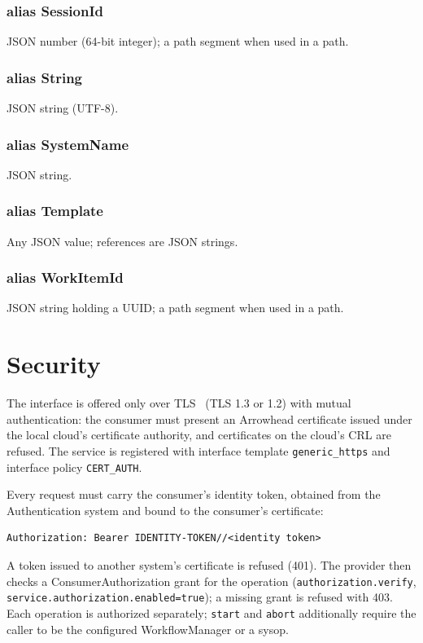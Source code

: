 \documentclass[a4paper]{arrowhead}
\newcommand{\pdef}[1]{{\textcolor{ArrowheadGrey}{#1\label{sec:model:primitives:#1}\label{sec:model:primitives:#1s}}}}
\begin{document}
\subsubsection*{alias \pdef{SessionId}}
JSON number (64-bit integer); a path segment when used in a path.

\subsubsection*{alias \pdef{String}}
JSON string (UTF-8).

\subsubsection*{alias \pdef{SystemName}}
JSON string.

\subsubsection*{alias \pdef{Template}}
Any JSON value; references are JSON strings.

\subsubsection*{alias \pdef{WorkItemId}}
JSON string holding a UUID; a path segment when used in a path.



\section{Security}
\label{sec:security}
The interface is offered only over TLS~\cite{rfc8446} (TLS 1.3 or 1.2) with mutual authentication: the consumer must
present an Arrowhead certificate issued under the local cloud's certificate authority, and certificates on the
cloud's CRL are refused. The service is registered with interface template \texttt{generic\_https} and interface
policy \texttt{CERT\_AUTH}.

Every request must carry the consumer's identity token, obtained from the Authentication system and bound to the
consumer's certificate:
\begin{lstlisting}
Authorization: Bearer IDENTITY-TOKEN//<identity token>
\end{lstlisting}
A token issued to another system's certificate is refused (401). The provider then checks a ConsumerAuthorization
grant for the operation (\texttt{authorization.verify}, \texttt{service.authorization.enabled=true}); a missing grant is
refused with 403. Each operation is authorized separately; \texttt{start} and \texttt{abort} additionally require the caller to be the configured WorkflowManager or a sysop.
\end{document}

